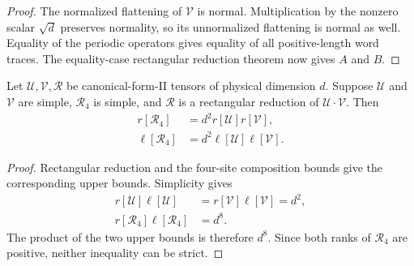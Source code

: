 \begin{proof}\leanok
    The normalized flattening of $\mathcal V$ is normal. Multiplication by
    the nonzero scalar $\sqrt d$ preserves normality, so its unnormalized
    flattening is normal as well. Equality of the periodic operators gives
    equality of all positive-length word traces. The equality-case
    rectangular reduction theorem now gives $A$ and $B$.
\end{proof}

\begin{lemma}
    \label{thm:mpu_composition_rank_saturation}
    \leanok
    Let $\mathcal U,\mathcal V,\mathcal R$ be canonical-form-II tensors of
    physical dimension $d$. Suppose $\mathcal U$ and $\mathcal V$ are simple,
    $\mathcal R_4$ is simple, and $\mathcal R$ is a rectangular reduction of
    $\mathcal U\mathbin{\cdot}\mathcal V$. Then
    \begin{align}
        r[\mathcal R_4]    & =d^2r[\mathcal U]r[\mathcal V],       \\
        \ell[\mathcal R_4] & =d^2\ell[\mathcal U]\ell[\mathcal V].
    \end{align}
\end{lemma}

\begin{proof}\leanok
    Rectangular reduction and the four-site composition bounds give the
    corresponding upper bounds. Simplicity gives
    \begin{align}
        r[\mathcal U]\ell[\mathcal U]
                                          & =r[\mathcal V]\ell[\mathcal V]=d^2, \\
        r[\mathcal R_4]\ell[\mathcal R_4] & =d^8.
    \end{align}
    The product of the two upper bounds is therefore $d^8$. Since both ranks
    of $\mathcal R_4$ are positive, neither inequality can be strict.
\end{proof}

